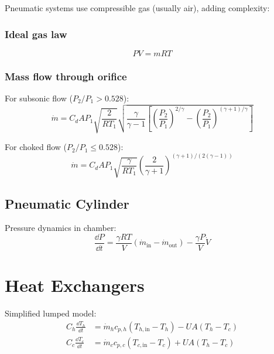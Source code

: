 Pneumatic systems use compressible gas (usually air), adding complexity:

\subsubsection{Ideal gas law}
\begin{equation}
PV = mRT
\end{equation}

\subsubsection{Mass flow through orifice}

For subsonic flow ($P_2/P_1 > 0.528$):
\begin{equation}
\dot{m} = C_d A P_1 \sqrt{\frac{2}{RT_1}} \sqrt{\frac{\gamma}{\gamma-1}\left[\left(\frac{P_2}{P_1}\right)^{2/\gamma} - \left(\frac{P_2}{P_1}\right)^{(\gamma+1)/\gamma}\right]}
\end{equation}

For choked flow ($P_2/P_1 \leq 0.528$):
\begin{equation}
\dot{m} = C_d A P_1 \sqrt{\frac{\gamma}{RT_1}}\left(\frac{2}{\gamma+1}\right)^{(\gamma+1)/(2(\gamma-1))}
\end{equation}

\subsection{Pneumatic Cylinder}

Pressure dynamics in chamber:
\begin{equation}
\frac{\dd P}{\dd t} = \frac{\gamma R T}{V}(\dot{m}_{\text{in}} - \dot{m}_{\text{out}}) - \frac{\gamma P}{V}\dot{V}
\end{equation}

\section{Heat Exchangers}
\label{sec:heat_exchanger}



Simplified lumped model:
\begin{align}
C_h\frac{\dd T_h}{\dd t} &= \dot{m}_h c_{p,h}(T_{h,\text{in}} - T_h) - UA(T_h - T_c) \\
C_c\frac{\dd T_c}{\dd t} &= \dot{m}_c c_{p,c}(T_{c,\text{in}} - T_c) + UA(T_h - T_c)
\end{align}

